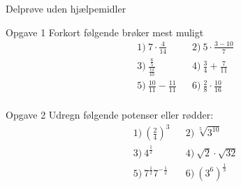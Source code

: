 \begin{center}
\LARGE
Delprøve uden hjælpemidler
\end{center}
\begin{opgavetekst}{Opgave 1}
	Forkort følgende brøker mest muligt
	\begin{align*}
		&1) \ 7\cdot \frac{4}{14}  &&2)\ 5\cdot \frac{3-10}{7}   \\
		&3) \ \frac{\frac{6}{5}}{\frac{12}{10}}  &&4)\ \frac{3}{4}+\frac{7}{11}   \\
		&5) \ \frac{10}{11}-\frac{11}{11}  &&6)\ \frac{2}{8}\cdot \frac{10}{16}   \\
	\end{align*}
\end{opgavetekst}
\begin{opgavetekst}{Opgave 2}
	Udregn følgende potenser eller rødder:
	\begin{align*}
		&1) \ \left(\frac{2}{4}\right)^3  &&2) \  \sqrt[5]{3^{10}}  \\
		&3) \ 4^{\frac{1}{2}}  &&4) \ \sqrt{2}\cdot \sqrt{32}   \\
		&5) \ 7^{\frac{1}{2}}7^{-\frac{1}{2}}  &&6) \ \left(3^{6}\right)^\frac{1}{3}   \\
	\end{align*}
\end{opgavetekst}

